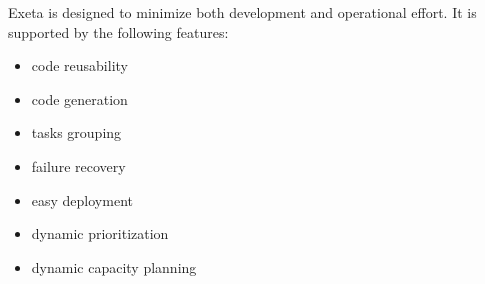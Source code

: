 \documentclass[a4paper,12pt,english,oneside]{book}
\newcommand{\exeta}{Exeta\xspace}
\begin{document}
\exeta is designed to minimize both development and operational effort. It is supported by the following features:
\begin{itemize}
  \item code reusability
  \item code generation
  \item tasks grouping
  \item failure recovery
  \item easy deployment
  \item dynamic prioritization
  \item dynamic capacity planning
\end{itemize}
%
%
\end{document}

